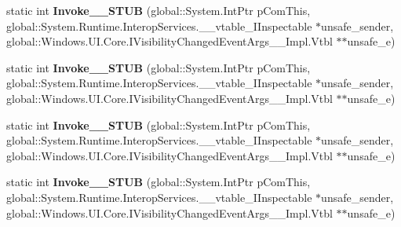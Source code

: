 \begin{DoxyCompactItemize}
\item 
\mbox{\label{struct_windows_1_1_u_i_1_1_xaml_1_1_window_visibility_changed_event_handler_____impl_1_1_vtbl_a77ce16ce6a1f680bf6419d18648863fc}} 
static int {\bfseries Invoke\+\_\+\+\_\+\+S\+T\+UB} (global\+::\+System.\+Int\+Ptr p\+Com\+This, global\+::\+System.\+Runtime.\+Interop\+Services.\+\_\+\+\_\+vtable\+\_\+\+I\+Inspectable $\ast$unsafe\+\_\+sender, global\+::\+Windows.\+U\+I.\+Core.\+I\+Visibility\+Changed\+Event\+Args\+\_\+\+\_\+\+Impl.\+Vtbl $\ast$$\ast$unsafe\+\_\+e)
\item 
\mbox{\label{struct_windows_1_1_u_i_1_1_xaml_1_1_window_visibility_changed_event_handler_____impl_1_1_vtbl_a77ce16ce6a1f680bf6419d18648863fc}} 
static int {\bfseries Invoke\+\_\+\+\_\+\+S\+T\+UB} (global\+::\+System.\+Int\+Ptr p\+Com\+This, global\+::\+System.\+Runtime.\+Interop\+Services.\+\_\+\+\_\+vtable\+\_\+\+I\+Inspectable $\ast$unsafe\+\_\+sender, global\+::\+Windows.\+U\+I.\+Core.\+I\+Visibility\+Changed\+Event\+Args\+\_\+\+\_\+\+Impl.\+Vtbl $\ast$$\ast$unsafe\+\_\+e)
\item 
\mbox{\label{struct_windows_1_1_u_i_1_1_xaml_1_1_window_visibility_changed_event_handler_____impl_1_1_vtbl_a77ce16ce6a1f680bf6419d18648863fc}} 
static int {\bfseries Invoke\+\_\+\+\_\+\+S\+T\+UB} (global\+::\+System.\+Int\+Ptr p\+Com\+This, global\+::\+System.\+Runtime.\+Interop\+Services.\+\_\+\+\_\+vtable\+\_\+\+I\+Inspectable $\ast$unsafe\+\_\+sender, global\+::\+Windows.\+U\+I.\+Core.\+I\+Visibility\+Changed\+Event\+Args\+\_\+\+\_\+\+Impl.\+Vtbl $\ast$$\ast$unsafe\+\_\+e)
\item 
\mbox{\label{struct_windows_1_1_u_i_1_1_xaml_1_1_window_visibility_changed_event_handler_____impl_1_1_vtbl_a77ce16ce6a1f680bf6419d18648863fc}} 
static int {\bfseries Invoke\+\_\+\+\_\+\+S\+T\+UB} (global\+::\+System.\+Int\+Ptr p\+Com\+This, global\+::\+System.\+Runtime.\+Interop\+Services.\+\_\+\+\_\+vtable\+\_\+\+I\+Inspectable $\ast$unsafe\+\_\+sender, global\+::\+Windows.\+U\+I.\+Core.\+I\+Visibility\+Changed\+Event\+Args\+\_\+\+\_\+\+Impl.\+Vtbl $\ast$$\ast$unsafe\+\_\+e)

\end{DoxyCompactItemize}
